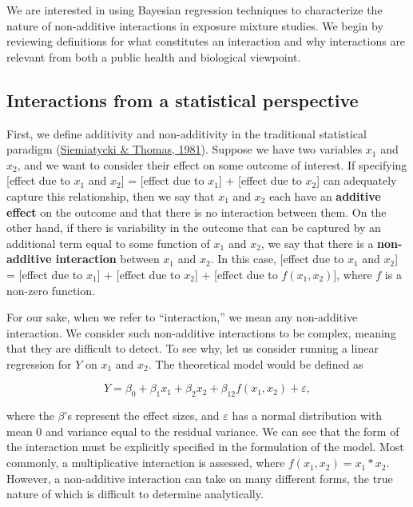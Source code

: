 \documentclass[12pt, twoside]{amherstthesis}
\begin{document}
We are interested in using Bayesian regression techniques to characterize the nature of non-additive interactions in exposure mixture studies. We begin by reviewing definitions for what constitutes an interaction and why interactions are relevant from both a public health and biological viewpoint.

\hypertarget{interactions-from-a-statistical-perspective}{%
\subsection{Interactions from a statistical perspective}\label{interactions-from-a-statistical-perspective}}

First, we define additivity and non-additivity in the traditional statistical paradigm (\protect\hyperlink{ref-siemiatycki_biological_1981}{Siemiatycki \& Thomas, 1981}). Suppose we have two variables \(x_1\) and \(x_2\), and we want to consider their effect on some outcome of interest. If specifying {[}effect due to \(x_1\) and \(x_2\){]} = {[}effect due to \(x_1\){]} + {[}effect due to \(x_2\){]} can adequately capture this relationship, then we say that \(x_1\) and \(x_2\) each have an \textbf{additive effect} on the outcome and that there is no interaction between them. On the other hand, if there is variability in the outcome that can be captured by an additional term equal to some function of \(x_1\) and \(x_2\), we say that there is a \textbf{non-additive interaction} between \(x_1\) and \(x_2\). In this case, {[}effect due to \(x_1\) and \(x_2\){]} = {[}effect due to \(x_1\){]} + {[}effect due to \(x_2\){]} + {[}effect due to \(f(x_1, x_2)\){]}, where \(f\) is a non-zero function.

For our sake, when we refer to ``interaction,'' we mean any non-additive interaction. We consider such non-additive interactions to be complex, meaning that they are difficult to detect. To see why, let us consider running a linear regression for \(Y\) on \(x_1\) and \(x_2\). The theoretical model would be defined as

\[
Y = \beta_0+\beta_1x_1+\beta_2x_2 + \beta_{12}f(x_1, x_2) + \varepsilon,
\]

\noindent where the \(\beta\)'s represent the effect sizes, and \(\varepsilon\) has a normal distribution with mean 0 and variance equal to the residual variance. We can see that the form of the interaction must be explicitly specified in the formulation of the model. Most commonly, a multiplicative interaction is assessed, where \(f(x_1, x_2) = x_1*x_2\). However, a non-additive interaction can take on many different forms, the true nature of which is difficult to determine analytically.
\end{document}
